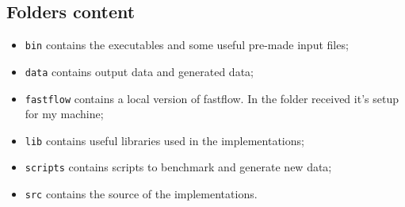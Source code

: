 \documentclass[12pt, letterpaper]{article}  %
\begin{document}
\subsection{Folders content}
\begin{itemize}
    \item \texttt{bin} contains the executables and some useful pre-made input files;
    \item \texttt{data} contains output data and generated data;
    \item \texttt{fastflow} contains a local version of fastflow. In the folder received it's setup for my machine;
    \item \texttt{lib} contains useful libraries used in the implementations;
    \item \texttt{scripts} contains scripts to benchmark and generate new data;
    \item \texttt{src} contains the source of the implementations.
\end{itemize}
\end{document}
